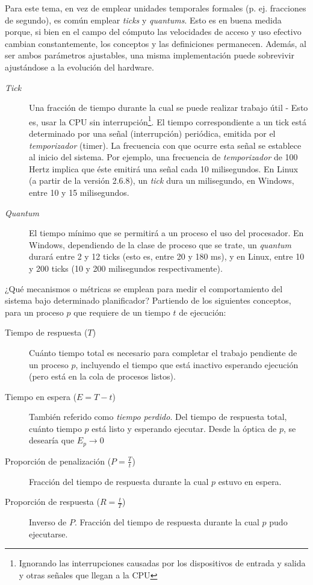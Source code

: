 \documentclass[11pt,fleqn]{book} %
\begin{document}
Para este tema, en vez de emplear unidades temporales formales
(p. ej. fracciones de segundo), es común emplear \emph{ticks} y
\emph{quantums}. Esto es en buena medida porque, si bien en el campo del
cómputo las velocidades de acceso y uso efectivo cambian
constantemente, los conceptos y las definiciones permanecen. Además,
al ser ambos parámetros ajustables, una misma implementación puede
sobrevivir ajustándose a la evolución del hardware.

\begin{description}
\item[\emph{Tick}] Una fracción de tiempo durante la cual se puede realizar
            trabajo útil - Esto es, usar la CPU sin interrupción\footnote{Ignorando
            las interrupciones causadas por los dispositivos de 
            entrada y salida y otras señales que llegan a la CPU }. El tiempo
	    correspondiente a un tick está determinado por una señal (interrupción)
	    periódica, emitida por el \emph{temporizador} (timer). La frecuencia con 
	    que ocurre esta señal se establece al inicio del sistema. Por ejemplo,
	    una frecuencia de \emph{temporizador} de 100 Hertz implica que éste
	    emitirá una señal cada 10 milisegundos.
            En Linux (a partir de la versión 2.6.8), un \emph{tick} dura un
            milisegundo, en Windows, entre 10 y 15 milisegundos.
\item[\emph{Quantum}] El tiempo mínimo que se permitirá a un proceso el uso
               del procesador. En Windows, dependiendo de la clase de
               proceso que se trate, un \emph{quantum} durará entre 2 y 12
               ticks (esto es, entre 20 y 180 ms), y en Linux, entre
               10 y 200 ticks (10 y 200 milisegundos respectivamente).
\end{description}

¿Qué mecanismos o métricas se  emplean para medir el
comportamiento del sistema bajo determinado planificador? Partiendo de
los siguientes conceptos, para un proceso $p$ que requiere de un
tiempo $t$ de ejecución:

\begin{description}
\item[Tiempo de respuesta ($T$)] Cuánto tiempo total es necesario para
     completar el trabajo pendiente de un proceso $p$, incluyendo el
     tiempo que está inactivo esperando ejecución (pero está en la
     cola de procesos listos).
\item[Tiempo en espera ($E = T - t$)] También referido como \emph{tiempo      perdido}. Del tiempo de respuesta total, cuánto tiempo $p$ está
     listo y esperando ejecutar. Desde la óptica de $p$, se desearía
     que $E_p \rightarrow 0$
\item[Proporción de penalización ($P = \frac{T}{t}$)] Fracción del
     tiempo de respuesta durante la cual $p$ estuvo en espera.
\item[Proporción de respuesta ($R = \frac{t}{T}$)] Inverso de
     $P$. Fracción del tiempo de respuesta durante la cual $p$ pudo
     ejecutarse.
\end{description}
\end{document}
